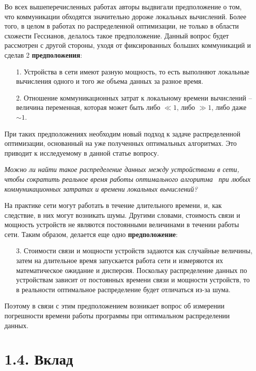 \documentclass{article}
\theoremstyle{definition}
\theoremstyle{plain}
\begin{document}
Во всех вышеперечисленных работах авторы выдвигали предположение о том, что коммуникации обходятся значительно дороже локальных вычислений. Более того, в целом в работах по распределенной оптимизации, не только в области схожести Гессианов, делалось такое предположение. Данный вопрос будет рассмотрен с другой стороны, уходя от фиксированных больших коммуникаций и сделав 2 \textbf{предположения}:
\begin{itemize}
    \item [1.] Устройства в сети имеют разную мощность, то есть выполняют локальные вычисления одного и того же объема данных за разное время.
    \item [2.] Отношение коммуникационных затрат к локальному времени вычислений -- величина переменная, которая может быть либо $\ll 1$, либо $\gg1$, либо даже $\sim 1$.
\end{itemize}
При таких предположениях необходим новый подход к задаче распределенной оптимизации, основанный на уже полученных оптимальных алгоритмах. Это приводит к исследуемому в данной статье вопросу.
\begin{center}
    \textit{ Можно ли найти такое распределение данных между устройствами в сети, чтобы сократить реальное время работы оптимального алгоритма} \cite{kovalev2022optimal}\textit{~при любых коммуникационных затратах и времени локальных вычислений?}
\end{center}

На практике сети могут работать в течение длительного времени, и, как следствие, в них могут возникать шумы. Другими словами, стоимость связи и мощность устройств не являются постоянными величинами в течении работы сети. Таким образом, делается еще одно \textbf{предположение}:
\begin{itemize}
    \item [3.] Стоимости связи и мощности устройств задаются как случайные величины, затем на длительное время запускается работа сети и измеряются их математическое ожидание и дисперсия. Поскольку распределение данных по устройствам зависит от постоянных времени связи и мощности устройств, то в реальности оптимальное распределение будет отличаться из-за шума.
\end{itemize}

Поэтому в связи с этим предположением возникает вопрос об измерении погрешности времени работы программы при оптимальном распределении данных.
\section*{1.4. Вклад}
\end{document}
